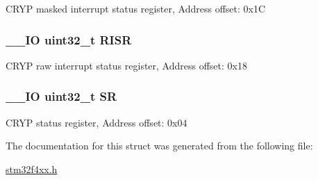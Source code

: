 C\-R\-Y\-P masked interrupt status register, Address offset\-: 0x1\-C \hypertarget{struct_c_r_y_p___type_def_aa196fddf0ba7d6e3ce29bdb04eb38b94}{
\subsubsection[{R\-I\-S\-R}]{\setlength{\rightskip}{0pt plus 5cm}\-\_\-\-\_\-\-I\-O uint32\-\_\-t R\-I\-S\-R}}\label{struct_c_r_y_p___type_def_aa196fddf0ba7d6e3ce29bdb04eb38b94}
C\-R\-Y\-P raw interrupt status register, Address offset\-: 0x18 \hypertarget{struct_c_r_y_p___type_def_af6aca2bbd40c0fb6df7c3aebe224a360}{
\subsubsection[{S\-R}]{\setlength{\rightskip}{0pt plus 5cm}\-\_\-\-\_\-\-I\-O uint32\-\_\-t S\-R}}\label{struct_c_r_y_p___type_def_af6aca2bbd40c0fb6df7c3aebe224a360}
C\-R\-Y\-P status register, Address offset\-: 0x04 

The documentation for this struct was generated from the following file\-:\begin{DoxyCompactItemize}
\item 
\hyperlink{stm32f4xx_8h}{stm32f4xx.\-h}\end{DoxyCompactItemize}
